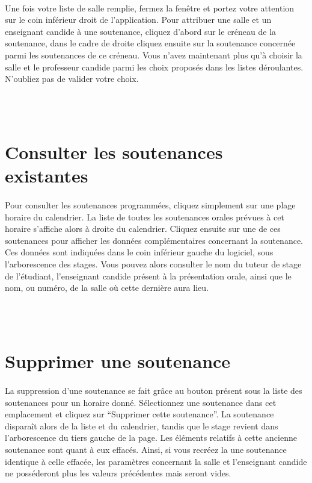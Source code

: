 \documentclass[a4paper,10pt]{report}
\begin{document}
	\paragraph{}
	  Une fois votre liste de salle remplie, fermez la fenêtre et portez votre attention sur le coin inférieur droit de l'application.
	  Pour attribuer une salle et un enseignant candide à une soutenance, cliquez d'abord sur le créneau de la soutenance, dans le cadre de droite cliquez ensuite sur la soutenance concernée parmi les soutenances de ce créneau.
	  Vous n'avez maintenant plus qu'à choisir la salle et le professeur candide parmi les choix proposés dans les listes déroulantes.
	  N'oubliez pas de valider votre choix.
	  
	
	~\\~\\
    \section{Consulter les soutenances existantes}
      \paragraph{}
	Pour consulter les soutenances programmées, cliquez simplement sur une plage horaire du calendrier.
	La liste de toutes les soutenances orales prévues à cet horaire s'affiche alors à droite du calendrier.
	Cliquez ensuite sur une de ces soutenances pour afficher les données complémentaires concernant la soutenance.
	Ces données sont indiquées dans le coin inférieur gauche du logiciel, sous l'arborescence des stages.
	Vous pouvez alors consulter le nom du tuteur de stage de l'étudiant, l'enseignant candide présent à la présentation orale, ainsi que le nom, ou numéro, de la salle où cette dernière aura lieu.
      
      ~\\~\\
    \section{Supprimer une soutenance}
      \paragraph{}
	La suppression d'une soutenance se fait grâce au bouton présent sous la liste des soutenances pour un horaire donné.
	Sélectionnez une soutenance dans cet emplacement et cliquez sur ``Supprimer cette soutenance''.
	La soutenance disparaît alors de la liste et du calendrier, tandis que le stage revient dans l'arborescence du tiers gauche de la page.
	Les éléments relatifs à cette ancienne soutenance sont quant à eux effacés.
	Ainsi, si vous recréez la une soutenance identique à celle effacée, les paramètres concernant la salle et l'enseignant candide ne posséderont plus les valeurs précédentes mais seront vides.
	
\end{document}
